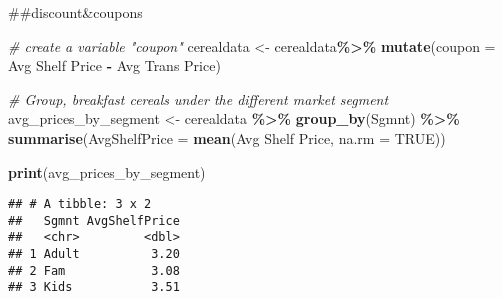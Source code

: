 \documentclass[
]{article}
\newenvironment{Shaded}{\begin{snugshade}}{\end{snugshade}}
\newcommand{\AttributeTok}[1]{\textcolor[rgb]{0.13,0.29,0.53}{#1}}
\newcommand{\CommentTok}[1]{\textcolor[rgb]{0.56,0.35,0.01}{\textit{#1}}}
\newcommand{\ConstantTok}[1]{\textcolor[rgb]{0.56,0.35,0.01}{#1}}
\newcommand{\FunctionTok}[1]{\textcolor[rgb]{0.13,0.29,0.53}{\textbf{#1}}}
\newcommand{\NormalTok}[1]{#1}
\newcommand{\OtherTok}[1]{\textcolor[rgb]{0.56,0.35,0.01}{#1}}
\newcommand{\SpecialCharTok}[1]{\textcolor[rgb]{0.81,0.36,0.00}{\textbf{#1}}}
\newcommand{\StringTok}[1]{\textcolor[rgb]{0.31,0.60,0.02}{#1}}
\begin{document}
\#\#discount\&coupons

\begin{Shaded}
\begin{Highlighting}[]
\CommentTok{\# create a variable "coupon"}
\NormalTok{cerealdata }\OtherTok{\textless{}{-}}\NormalTok{ cerealdata}\SpecialCharTok{\%\textgreater{}\%}
  \FunctionTok{mutate}\NormalTok{(}\AttributeTok{coupon =} \StringTok{\textasciigrave{}}\AttributeTok{Avg Shelf Price}\StringTok{\textasciigrave{}} \SpecialCharTok{{-}} \StringTok{\textasciigrave{}}\AttributeTok{Avg Trans Price}\StringTok{\textasciigrave{}}\NormalTok{)}
\end{Highlighting}
\end{Shaded}

\begin{Shaded}
\begin{Highlighting}[]
\CommentTok{\# Group, breakfast cereals under the different market segment }
\NormalTok{avg\_prices\_by\_segment }\OtherTok{\textless{}{-}}\NormalTok{ cerealdata }\SpecialCharTok{\%\textgreater{}\%}
  \FunctionTok{group\_by}\NormalTok{(Sgmnt) }\SpecialCharTok{\%\textgreater{}\%}
  \FunctionTok{summarise}\NormalTok{(}\AttributeTok{AvgShelfPrice =} \FunctionTok{mean}\NormalTok{(}\StringTok{\textasciigrave{}}\AttributeTok{Avg Shelf Price}\StringTok{\textasciigrave{}}\NormalTok{, }\AttributeTok{na.rm =} \ConstantTok{TRUE}\NormalTok{))}

\FunctionTok{print}\NormalTok{(avg\_prices\_by\_segment)}
\end{Highlighting}
\end{Shaded}

\begin{verbatim}
## # A tibble: 3 x 2
##   Sgmnt AvgShelfPrice
##   <chr>         <dbl>
## 1 Adult          3.20
## 2 Fam            3.08
## 3 Kids           3.51
\end{verbatim}
\end{document}
